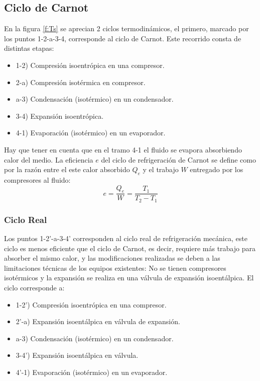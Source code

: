 \documentclass[11pt,letterpaper]{extarticle}        %
\numberwithin{equation}{section}                    %
\begin{document}
\subsection*{Ciclo de Carnot}
En la figura \ref{f:Ts} se aprecian 2 ciclos termodinámicos, el primero, marcado por los puntos 1-2-a-3-4, corresponde al ciclo de Carnot. Este recorrido consta de distintas etapas:
\begin{itemize}
\item 1-2) Compresión isoentrópica en una compresor.
\item 2-a) Compresión isotérmica en compresor.
\item a-3) Condensación (isotérmico) en un condensador.
\item 3-4) Expansión isoentrópica.
\item 4-1) Evaporación (isotérmico) en un evaporador.
\end{itemize}
Hay que tener en cuenta que en el tramo 4-1 el fluido se evapora absorbiendo calor del medio. La eficiencia $e$ del ciclo de refrigeración de Carnot se define como por la razón entre el este calor absorbido $Q_e$ y el trabajo $W$ entregado por los compresores al fluido:
\begin{equation}
e = \frac{Q_e}{W} = \frac{T_1}{T_2-T_1}
\label{e:eficiencia}
\end{equation}

\subsubsection*{Ciclo Real}
Los puntos 1-2'-a-3-4' corresponden al ciclo real de refrigeración mecánica, este ciclo es menos eficiente que el ciclo de Carnot, es decir, requiere más trabajo para absorber el mismo calor, y las modificaciones realizadas se deben a las limitaciones técnicas de los equipos existentes: No se tienen compresores isotérmicos y la expansión se realiza en una válvula de expansión isoentálpica. El ciclo corresponde a:
\begin{itemize}
\item 1-2') Compresión isoentrópica en una compresor.
\item 2'-a) Expansión isoentálpica en válvula de expansión.
\item a-3) Condensación (isotérmico) en un condensador.
\item 3-4') Expansión isoentálpica en válvula.
\item 4'-1) Evaporación (isotérmico) en un evaporador.
\end{itemize}
\end{document}
